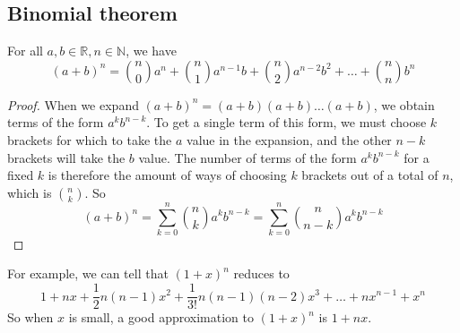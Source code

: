 \subsection{Binomial theorem}
\begin{theorem}
	For all \(a, b \in \mathbb R, n \in \mathbb N\), we have
	\[
		(a+b)^n = \binom{n}{0}a^n + \binom{n}{1}a^{n-1}b + \binom{n}{2}a^{n-2}b^2 + \dots + \binom{n}{n}b^n
	\]
\end{theorem}
\begin{proof}
	When we expand \((a+b)^n = (a+b)(a+b)\dots(a+b)\), we obtain terms of the form \(a^k b^{n-k}\).
	To get a single term of this form, we must choose \(k\) brackets for which to take the \(a\) value in the expansion, and the other \(n-k\) brackets will take the \(b\) value.
	The number of terms of the form \(a^k b^{n-k}\) for a fixed \(k\) is therefore the amount of ways of choosing \(k\) brackets out of a total of \(n\), which is \(\binom{n}{k}\).
	So
	\[
		(a+b)^n = \sum_{k=0}^n \binom{n}{k}a^k b^{n-k} = \sum_{k=0}^n \binom{n}{n-k}a^k b^{n-k}
	\]
\end{proof}
For example, we can tell that \((1+x)^n\) reduces to
\[
	1 + nx + \frac{1}{2}n(n-1)x^2 + \frac{1}{3!}n(n-1)(n-2)x^3 + \dots + nx^{n-1} + x^n
\]
So when \(x\) is small, a good approximation to \((1+x)^n\) is \(1 + nx\).

